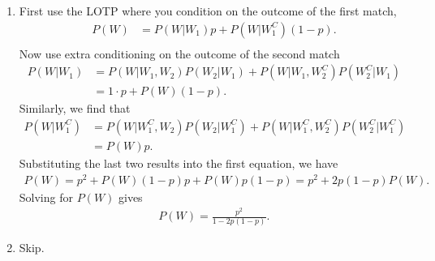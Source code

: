 

\setcounter{theorem}{49}
\begin{exercise}[BH.2.50] 
\begin{solution}
	\begin{enumerate}
		\item First use the LOTP where you condition on the outcome of the first match,
		\begin{align*}
			P(W)& = P(W|W_{1})p + P(W|W_{1}^{C})(1-p).\\
		\end{align*}
		Now use extra conditioning on the outcome of the second match
		\begin{align*}
			P(W|W_{1})& = P(W|W_{1},W_{2})P(W_{2}|W_{1}) + P(W|W_{1},W_{2}^C)P(W_{2}^C|W_{1})\\
			&=1\cdot p + P(W)(1-p).
		\end{align*}
		Similarly, we find that
		\begin{align*}
			P(W|W_{1}^{C}) &= P(W|W_{1}^{C},W_{2})P(W_{2}|W_{1}^{C})+P(W|W_{1}^{C},W_{2}^C)P(W_{2}^C|W_{1}^{C})\\
			&=P(W)p.
		\end{align*}
		Substituting the last two results into the first equation, we have
		\begin{align*}
			P(W) = p^2 + P(W)(1-p)p + P(W)p(1-p) = p^2 +2p(1-p)P(W).
		\end{align*}
		Solving for $P(W)$ gives
		\begin{align*}
			P(W) =\frac{p^2}{1-2p(1-p)}.
		\end{align*}
		\item Skip.
	\end{enumerate}
\end{solution}
\end{exercise}

